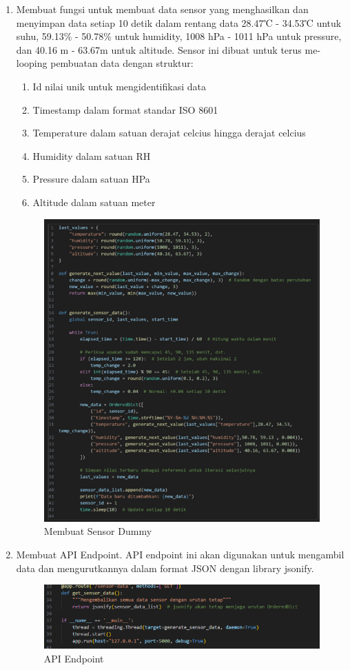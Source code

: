 \begin{enumerate}[label={\alph*.}]
\begin{enumerate}[label={\arabic*.}]
		\item Membuat fungsi untuk membuat data sensor yang menghasilkan dan menyimpan data setiap 10 detik dalam rentang data 28.47℃ - 34.53℃ untuk suhu, 59.13\% - 50.78\% untuk humidity, 1008 hPa - 1011 hPa untuk pressure, dan 40.16 m - 63.67m untuk altitude. Sensor ini dibuat untuk terus me-looping pembuatan data dengan struktur: 
		\begin{enumerate}[label={\alph*.}]
			\item Id nilai unik untuk mengidentifikasi data 
			\item Timestamp dalam format standar ISO 8601
			\item Temperature dalam satuan derajat celcius hingga derajat celcius 
			\item Humidity dalam satuan RH
			\item Pressure dalam satuan HPa 
			\item Altitude dalam satuan meter
		\end{enumerate}
		\begin{figure}[H]
			\centering
			\includegraphics[width=0.8\linewidth]{gambar/Dasar teori/generate_dummy.png}
			\caption{Membuat Sensor Dummy}
			\label{Membuat Sensor Dummy}
		\end{figure}
		
		\item Membuat API Endpoint. API endpoint ini akan digunakan untuk mengambil data dan mengurutkannya dalam format JSON dengan library jsonify.
		\begin{figure}[H]
			\centering
			\includegraphics[width=0.8\linewidth]{gambar/Dasar teori/API.png}
			\caption{API Endpoint}
			\label{API Endpoint}
		\end{figure}
		

\end{enumerate}
\end{enumerate}
